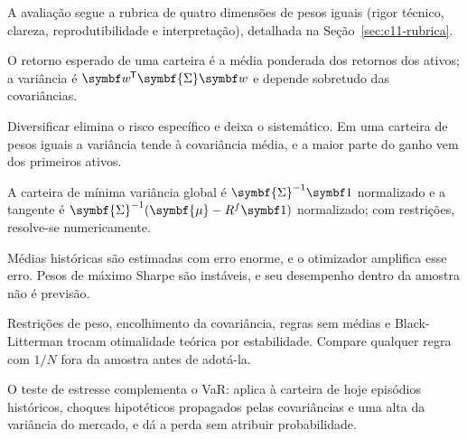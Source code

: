 A avaliação segue a rubrica de quatro dimensões de pesos iguais (rigor técnico, clareza, reprodutibilidade e interpretação), detalhada na Seção~\ref{sec:c11-rubrica}.

\begin{resumo}
  \item O retorno esperado de uma carteira é a média ponderada dos retornos dos ativos; a variância é $\vetor{w}\T\symbf{\Sigma}\vetor{w}$ e depende sobretudo das covariâncias.
  \item Diversificar elimina o risco específico e deixa o sistemático. Em uma carteira de pesos iguais a variância tende à covariância média, e a maior parte do ganho vem dos primeiros ativos.
  \item A carteira de mínima variância global é $\symbf{\Sigma}^{-1}\vetor{1}$ normalizado e a tangente é $\symbf{\Sigma}^{-1}(\symbf{\mu} - R^f\vetor{1})$ normalizado; com restrições, resolve-se numericamente.
  \item Médias históricas são estimadas com erro enorme, e o otimizador amplifica esse erro. Pesos de máximo Sharpe são instáveis, e seu desempenho dentro da amostra não é previsão.
  \item Restrições de peso, encolhimento da covariância, regras sem médias e Black-Litterman trocam otimalidade teórica por estabilidade. Compare qualquer regra com $1/N$ fora da amostra antes de adotá-la.
  \item O teste de estresse complementa o VaR: aplica à carteira de hoje episódios históricos, choques hipotéticos propagados pelas covariâncias e uma alta da variância do mercado, e dá a perda sem atribuir probabilidade.
\end{resumo}

